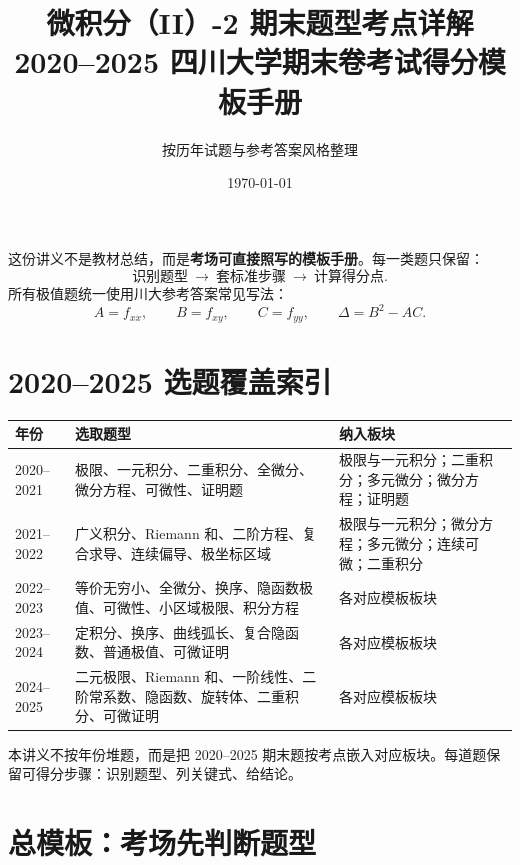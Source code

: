 \documentclass[11pt,a4paper,UTF8]{ctexart}
\title{\Huge 微积分（II）-2 期末题型考点详解\\[0.3em]
\Large 2020--2025 四川大学期末卷考试得分模板手册}
\author{按历年试题与参考答案风格整理}
\date{\today}
\begin{document}
\maketitle
\thispagestyle{empty}

\begin{scorebox}[定位]
这份讲义不是教材总结，而是\textbf{考场可直接照写的模板手册}。每一类题只保留：
\[
\text{识别题型}\ \longrightarrow\ \text{套标准步骤}\ \longrightarrow\ \text{计算得分点}.
\]
所有极值题统一使用川大参考答案常见写法：
\[
A=f_{xx},\qquad B=f_{xy},\qquad C=f_{yy},\qquad \Delta=B^2-AC.
\]
\end{scorebox}

\tableofcontents
\newpage

\section{2020--2025 选题覆盖索引}

\begin{center}
\renewcommand{\arraystretch}{1.22}
\begin{tabular}{p{2.7cm}p{4.5cm}p{7.2cm}}
\toprule
\textbf{年份} & \textbf{选取题型} & \textbf{纳入板块}\\
\midrule
2020--2021 & 极限、一元积分、二重积分、全微分、微分方程、可微性、证明题 & 极限与一元积分；二重积分；多元微分；微分方程；证明题\\
2021--2022 & 广义积分、Riemann 和、二阶方程、复合求导、连续偏导、极坐标区域 & 极限与一元积分；微分方程；多元微分；连续可微；二重积分\\
2022--2023 & 等价无穷小、全微分、换序、隐函数极值、可微性、小区域极限、积分方程 & 各对应模板板块\\
2023--2024 & 定积分、换序、曲线弧长、复合隐函数、普通极值、可微证明 & 各对应模板板块\\
2024--2025 & 二元极限、Riemann 和、一阶线性、二阶常系数、隐函数、旋转体、二重积分、可微证明 & 各对应模板板块\\
\bottomrule
\end{tabular}
\end{center}

\begin{scorebox}[使用方式]
本讲义不按年份堆题，而是把 2020--2025 期末题按考点嵌入对应板块。每道题保留可得分步骤：识别题型、列关键式、给结论。
\end{scorebox}

\newpage

\section{总模板：考场先判断题型}
\end{document}
